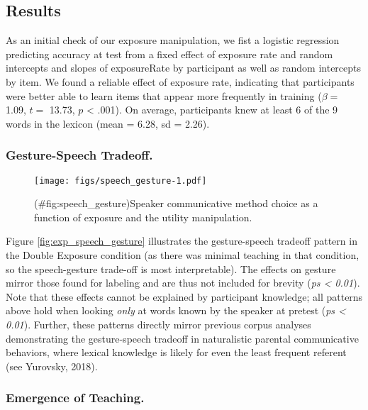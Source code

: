 \documentclass[english,,man,floatsintext]{apa6}
\begin{document}
\hypertarget{results-1}{%
\subsection{Results}\label{results-1}}

As an initial check of our exposure manipulation, we fist a logistic regression predicting accuracy at test from a fixed effect of exposure rate and random intercepts and slopes of exposureRate by participant as well as random intercepts by item. We found a reliable effect of exposure rate, indicating that participants were better able to learn items that appear more frequently in training (\(\beta =\) 1.09, \(t =\) 13.73, \(p\) \textless{} .001). On average, participants knew at least 6 of the 9 words in the lexicon (mean = 6.28, sd = 2.26).

\hypertarget{gesture-speech-tradeoff.}{%
\subsubsection{Gesture-Speech Tradeoff.}\label{gesture-speech-tradeoff.}}

\begin{figure}
\centering
\texttt{[image: figs/speech\_gesture-1.pdf]}
\caption{(\#fig:speech\_gesture)Speaker communicative method choice as a function of exposure and the utility manipulation.}
\end{figure}

Figure \ref{fig:exp_speech_gesture} illustrates the gesture-speech tradeoff pattern in the Double Exposure condition (as there was minimal teaching in that condition, so the speech-gesture trade-off is most interpretable). The effects on gesture mirror those found for labeling and are thus not included for brevity (\emph{ps \textless{} 0.01}). Note that these effects cannot be explained by participant knowledge; all patterns above hold when looking \emph{only} at words known by the speaker at pretest (\emph{ps \textless{} 0.01}). Further, these patterns directly mirror previous corpus analyses demonstrating the gesture-speech tradeoff in naturalistic parental communicative behaviors, where lexical knowledge is likely for even the least frequent referent (see Yurovsky, 2018).

\hypertarget{emergence-of-teaching.}{%
\subsubsection{Emergence of Teaching.}\label{emergence-of-teaching.}}
\end{document}

